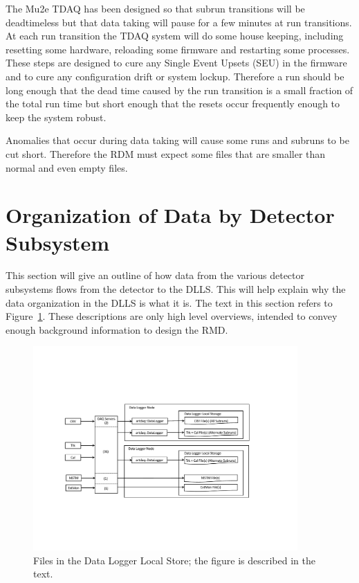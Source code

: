 The Mu2e TDAQ has been designed so that subrun transitions will be deadtimeless
but that data taking will pause for a few minutes at run transitions.
At each run transition the TDAQ system will do some house keeping,
including resetting some hardware, reloading some firmware and restarting some processes.
These steps are designed to cure any Single Event Upsets (SEU) in the firmware
and to cure any configuration drift or system lockup.
Therefore a run should be long enough that the dead time
caused by the run transition is a small fraction of the total run time
but short enough that the resets occur frequently enough
to keep the system robust.

Anomalies that occur during data taking will cause some runs
and subruns to be cut short.
Therefore the RDM must expect some files that are smaller than normal
and even empty files.


\section{Organization of Data by Detector Subsystem }
\label{ssec:dataOrganization}

This section will give an outline of how data from the
various detector subsystems flows from the detector to the DLLS.
This will help explain why the data organization in the DLLS is what it is.
The text in this section refers to Figure~\ref{fig:filesDLLS}.
These descriptions are only high level overviews,
intended to convey enough background information to design the RMD.


\begin{figure}[tbp]
\centering
\includegraphics[width=0.9\textwidth]{figures/FilesInDLLS.pdf}
\caption[Files in the DLLS]{
  Files in the Data Logger Local Store; the figure is described in the text.}
\label{fig:filesDLLS}
\end{figure}


